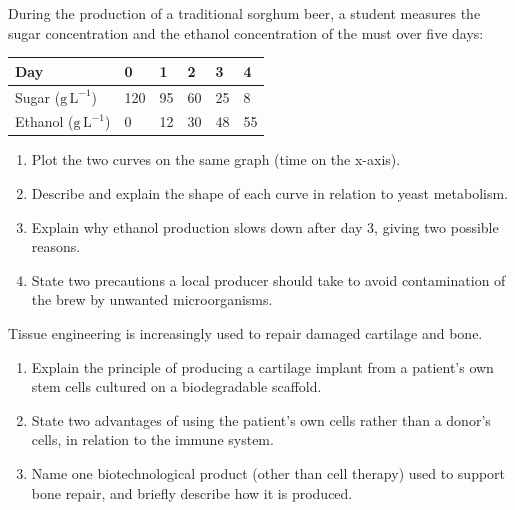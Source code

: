 \documentclass[11pt]{article}
\newcounter{popsec}
\newcounter{popsub}
\newcommand{\courssub}[1]{%
  \stepcounter{popsub}%
  \par\vspace{9pt}\noindent{\popxbold\fontsize{11.5}{13}\selectfont\color{popink}{\color{poporange}\thepopsec.\thepopsub}\hspace{6pt}#1}\par\nopagebreak\vspace{4pt}
}
\begin{document}
\begin{exercice}
During the production of a traditional sorghum beer, a student measures the sugar concentration and the ethanol concentration of the must over five days:
\begin{center}
\begin{tabularx}{\linewidth}{|l|X|X|X|X|X|}
\hline
\rowcolor{popblueL} Day & 0 & 1 & 2 & 3 & 4 \\
\hline Sugar ($\mathrm{g\,L^{-1}}$) & 120 & 95 & 60 & 25 & 8 \\
\hline Ethanol ($\mathrm{g\,L^{-1}}$) & 0 & 12 & 30 & 48 & 55 \\
\hline
\end{tabularx}
\end{center}
\begin{enumerate}
\item Plot the two curves on the same graph (time on the x-axis).
\item Describe and explain the shape of each curve in relation to yeast metabolism.
\item Explain why ethanol production slows down after day 3, giving two possible reasons.
\item State two precautions a local producer should take to avoid contamination of the brew by unwanted microorganisms.
\end{enumerate}
\end{exercice}

\begin{exercice}
Tissue engineering is increasingly used to repair damaged cartilage and bone.
\begin{enumerate}
\item Explain the principle of producing a cartilage implant from a patient's own stem cells cultured on a biodegradable scaffold.
\item State two advantages of using the patient's own cells rather than a donor's cells, in relation to the immune system.
\item Name one biotechnological product (other than cell therapy) used to support bone repair, and briefly describe how it is produced.
\end{enumerate}
\end{exercice}

\courssub{I prepare for the GCE}
\end{document}
